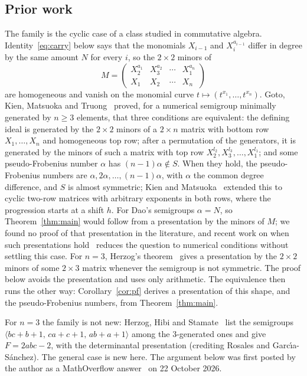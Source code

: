 \documentclass[11pt]{amsart}
\theoremstyle{remark}
\begin{document}
\subsection*{Prior work}
The family is the cyclic case of a class studied in commutative algebra. Identity~\eqref{eq:carry} below says that the monomials $X_{i-1}$ and $X_i^{a_{i-1}}$ differ in degree by the same amount $N$ for every $i$, so the $2\times2$ minors of
\[
M=\begin{pmatrix} X_2^{a_1} & X_3^{a_2} & \cdots & X_1^{a_n}\\ X_1 & X_2 & \cdots & X_n\end{pmatrix}
\]
are homogeneous and vanish on the monomial curve $t\mapsto(t^{x_1},\dots,t^{x_n})$. Goto, Kien, Matsuoka and Truong~\cite[Theorem~1.2]{GKMT} proved, for a numerical semigroup minimally generated by $n\ge3$ elements, that three conditions are equivalent: the defining ideal is generated by the $2\times2$ minors of a $2\times n$ matrix with bottom row $X_1,\dots,X_n$ and homogeneous top row; after a permutation of the generators, it is generated by the minors of such a matrix with top row $X_2^{l_2},X_3^{l_3},\dots,X_1^{l_1}$; and some pseudo-Frobenius number $\alpha$ has $(n-1)\alpha\notin S$. When they hold, the pseudo-Frobenius numbers are $\alpha,2\alpha,\dots,(n-1)\alpha$, with $\alpha$ the common degree difference, and $S$ is almost symmetric; Kien and Matsuoka~\cite[Theorem~3]{KM} extended this to cyclic two-row matrices with arbitrary exponents in both rows, where the progression starts at a shift $h$. For Dao's semigroups $\alpha=N$, so Theorem~\ref{thm:main} would follow from a presentation by the minors of $M$; we found no proof of that presentation in the literature, and recent work on when such presentations hold~\cite{MT,K} reduces the question to numerical conditions without settling this case. For $n=3$, Herzog's theorem~\cite{He} gives a presentation by the $2\times2$ minors of some $2\times3$ matrix whenever the semigroup is not symmetric. The proof below avoids the presentation and uses only arithmetic. The equivalence then runs the other way: Corollary~\ref{cor:pf} derives a presentation of this shape, and the pseudo-Frobenius numbers, from Theorem~\ref{thm:main}.

For $n=3$ the family is not new: Herzog, Hibi and Stamate~\cite[Theorem~7.11(ii)]{HHS} list the semigroups $\langle bc+b+1,\,ca+c+1,\,ab+a+1\rangle$ among the $3$-generated ones and give $F=2abc-2$, with the determinantal presentation (crediting Rosales and Garc\'{\i}a-S\'anchez). The general case is new here. The argument below was first posted by the author as a MathOverflow answer~\cite{Ans} on 22 October 2026.
\end{document}
